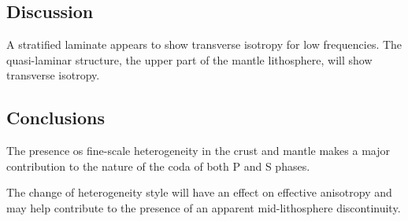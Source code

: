 \subsection{Discussion}
A stratified laminate appears to show transverse isotropy for low frequencies.
The quasi-laminar structure, the upper part of the mantle lithosphere,
will show transverse isotropy.

\subsection{Conclusions}
The presence os fine-scale heterogeneity in the crust and mantle makes
a major contribution to the nature of the coda of both P and S phases.

The change of heterogeneity style will have an effect on effective anisotropy
and may help contribute to the presence of
an apparent mid-lithosphere discontinuity.

